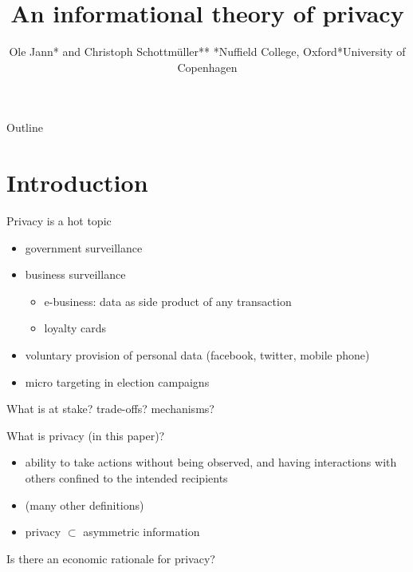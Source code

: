 \documentclass[bigger]{beamer}
\author{Ole Jann* and Christoph Schottmüller** \linebreak \vspace*{0.3cm}\linebreak\scriptsize{*Nuffield College, Oxford\linebreak **University of Copenhagen}}
\date{}
\title{An informational theory of privacy}
\begin{document}
\maketitle
\begin{frame}{Outline}
\tableofcontents
\end{frame}



\section{Introduction}
\label{sec:org4472673}

\begin{frame}[label={sec:org5e7ecd5}]{Privacy is a hot topic}
\begin{itemize}
\item government surveillance
\item business surveillance
\begin{itemize}
\item e-business: data as side product of any transaction
\item loyalty cards
\end{itemize}
\item voluntary provision of personal data (facebook, twitter, mobile phone)
\item micro targeting in election campaigns
\end{itemize}

\pause

\vspace*{0.5cm}
\begin{center}
What is at stake? trade-offs? mechanisms?
\end{center}
\end{frame}


\begin{frame}[label={sec:org9f30475}]{What is privacy (in this paper)?}
\begin{itemize}
\item ability to take actions without being observed, and having interactions with others confined to the intended recipients
\item (many other definitions)
\item privacy \(\subset\) asymmetric information
\end{itemize}

\pause

\vspace*{0.3cm}
\begin{center}
\begin{large}
Is there an economic rationale for privacy?
\end{large}
\end{center}
\end{frame}
\end{document}
